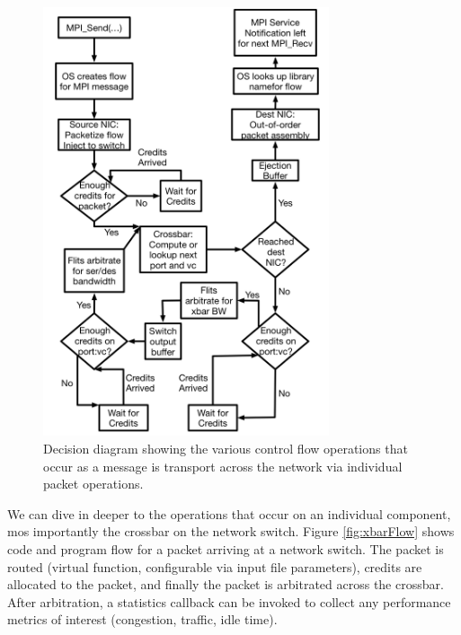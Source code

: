 \begin{figure}
\centering
\includegraphics[width=0.75\textwidth]{figures/DecisionFlow.png}
\caption{Decision diagram showing the various control flow operations that occur as a message is transport across the network via individual packet operations.}
\label{fig:controlFlow}
\end{figure}

We can dive in deeper to the operations that occur on an individual component, mos importantly the crossbar on the network switch. Figure \ref{fig:xbarFlow} shows code and program flow for a packet arriving at a network switch.  The packet is routed (virtual function, configurable via input file parameters), credits are allocated to the packet, and finally the packet is arbitrated across the crossbar. After arbitration, a statistics callback can be invoked to collect any performance metrics of interest (congestion, traffic, idle time).

